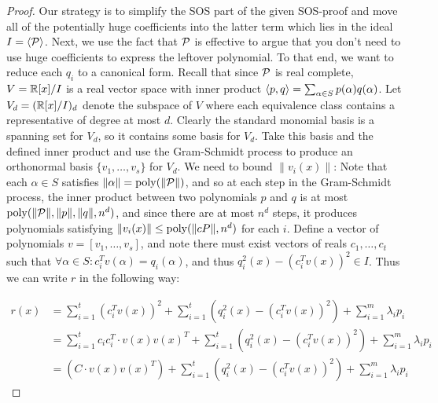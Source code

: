 \begin{proof}
Our strategy is to simplify the SOS part of the given SOS-proof and move all of the potentially huge coefficients into the latter term which lies in the ideal $I = \langle \mathcal P\rangle$. Next, we use the fact that $\mathcal P$ is effective to argue that you don't need to use huge coefficients to express the leftover polynomial. To that end, we want to reduce each $q_i$ to a canonical form. Recall that since $\mathcal P$ is real complete, $V = \mathbb R[x]/I$ is a real vector space with inner product $\langle p, q\rangle = \sum_{\alpha \in S} p(\alpha)q(\alpha)$. Let $V_d = (\mathbb R[x]/I)_d$ denote the subspace of $V$ where each equivalence class contains a representative of degree at most $d$. Clearly the standard monomial basis is a spanning set for $V_d$, so it contains some basis for $V_d$. Take this basis and the defined inner product and use the Gram-Schmidt process to produce an orthonormal basis $\{v_1,\dots,v_s\}$ for $V_d$. We need to bound $\|v_i(x)\|$: Note that each $\alpha \in S$ satisfies $\|\alpha\| = \operatorname{poly}(\|\mathcal P\|)$, and so at each step in the Gram-Schmidt process, the inner product between two polynomials $p$ and $q$ is at most $\operatorname{poly}(\|\mathcal P\|,\|p\|,\|q\|,n^d)$, and since there are at most $n^d$ steps, it produces polynomials satisfying $\|v_i(x)\| \leq \operatorname{poly}(\|cP\|,n^d)$ for each $i$. Define a vector of polynomials $v = [v_1,\dots,v_s]$, and note there must exist vectors of reals $c_1,\dots,c_t$ such that $\forall \alpha \in S: c_i^Tv(\alpha) = q_i(\alpha)$, and thus $q_i^2(x) - (c_i^Tv(x))^2 \in I$. Thus we can write $r$ in the following way:

\begin{align*}
r(x) &= \sum_{i=1}^t (c_i^Tv(x))^2 + \sum_{i=1}^t \left(q_i^2(x) - (c_i^Tv(x))^2\right) + \sum_{i=1}^m \lambda_ip_i \\
&= \sum_{i=1}^t c_ic_i^T \cdot v(x)v(x)^T + \sum_{i=1}^t \left(q_i^2(x) - (c_i^Tv(x))^2\right) + \sum_{i=1}^m \lambda_ip_i \\
&= (C \cdot v(x)v(x)^T) + \sum_{i=1}^t \left(q_i^2(x) - (c_i^Tv(x))^2\right) + \sum_{i=1}^m \lambda_ip_i
\end{align*}


\end{proof}
